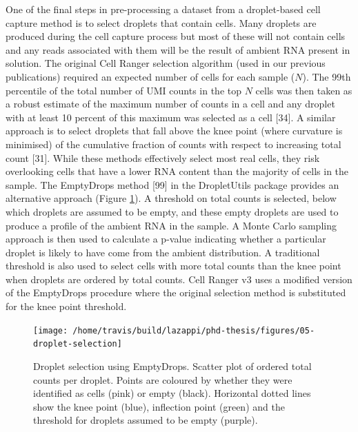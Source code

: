 \documentclass[11pt,a4paper,titlepage,twoside,openright]{style/unimelbthesis}
\theoremstyle{definition}
\theoremstyle{definition}
\theoremstyle{definition}
\theoremstyle{remark}
\begin{document}
\begin{mainmatter}
One of the final steps in pre-processing a dataset from a droplet-based cell capture method is to select droplets that contain cells. Many droplets are produced during the cell capture process but most of these will not contain cells and any reads associated with them will be the result of ambient RNA present in solution. The original Cell Ranger selection algorithm (used in our previous publications) required an expected number of cells for each sample (\(N\)). The 99th percentile of the total number of UMI counts in the top \(N\) cells was then taken as a robust estimate of the maximum number of counts in a cell and any droplet with at least 10 percent of this maximum was selected as a cell {[}34{]}. A similar approach is to select droplets that fall above the knee point (where curvature is minimised) of the cumulative fraction of counts with respect to increasing total count {[}31{]}. While these methods effectively select most real cells, they risk overlooking cells that have a lower RNA content than the majority of cells in the sample. The EmptyDrops method {[}99{]} in the DropletUtils package provides an alternative approach (Figure \ref{fig:droplet-selection}). A threshold on total counts is selected, below which droplets are assumed to be empty, and these empty droplets are used to produce a profile of the ambient RNA in the sample. A Monte Carlo sampling approach is then used to calculate a p-value indicating whether a particular droplet is likely to have come from the ambient distribution. A traditional threshold is also used to select cells with more total counts than the knee point when droplets are ordered by total counts. Cell Ranger v3 uses a modified version of the EmptyDrops procedure where the original selection method is substituted for the knee point threshold.

\begin{figure}

{\centering \texttt{[image: /home/travis/build/lazappi/phd-thesis/figures/05-droplet-selection]} 

}

\caption[Droplet selection using EmptyDrops.]{Droplet selection using EmptyDrops. Scatter plot of ordered total counts per droplet. Points are coloured by whether they were identified as cells (pink) or empty (black). Horizontal dotted lines show the knee point (blue), inflection point (green) and the threshold for droplets assumed to be empty (purple).}\label{fig:droplet-selection}
\end{figure}






\end{mainmatter}
\end{document}
